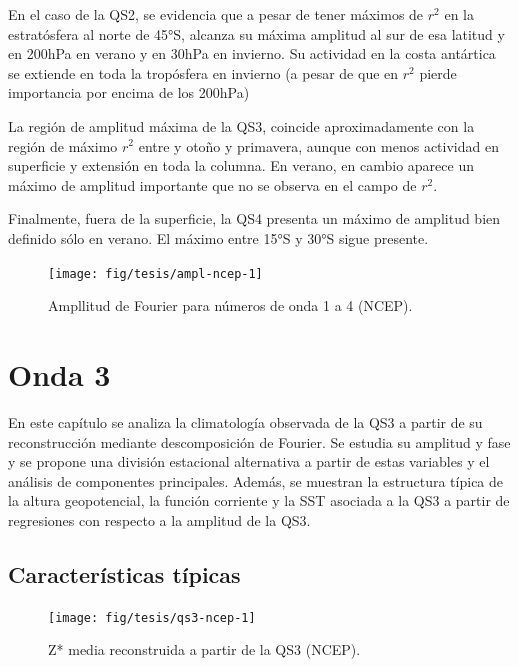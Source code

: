\documentclass[spanish,a4paper,12pt,oneside]{book}
\begin{document}
En el caso de la QS2, se evidencia que a pesar de tener máximos de
\(r^2\) en la estratósfera al norte de 45°S, alcanza su máxima amplitud
al sur de esa latitud y en 200hPa en verano y en 30hPa en invierno. Su
actividad en la costa antártica se extiende en toda la tropósfera en
invierno (a pesar de que en \(r^2\) pierde importancia por encima de los
200hPa)

La región de amplitud máxima de la QS3, coincide aproximadamente con la
región de máximo \(r^2\) entre y otoño y primavera, aunque con menos
actividad en superficie y extensión en toda la columna. En verano, en
cambio aparece un máximo de amplitud importante que no se observa en el
campo de \(r^2\).

Finalmente, fuera de la superficie, la QS4 presenta un máximo de
amplitud bien definido sólo en verano. El máximo entre 15°S y 30°S sigue
presente.

\begin{landscape}\begin{figure}

{\centering \texttt{[image: fig/tesis/ampl-ncep-1]} 

}

\caption{Ampllitud de Fourier para números de onda 1 a 4 (NCEP).}\label{fig:ampl-ncep}
\end{figure}
\end{landscape}

\chapter{Onda 3}\label{onda-3}

En este capítulo se analiza la climatología observada de la QS3 a partir
de su reconstrucción mediante descomposición de Fourier. Se estudia su
amplitud y fase y se propone una división estacional alternativa a
partir de estas variables y el análisis de componentes principales.
Además, se muestran la estructura típica de la altura geopotencial, la
función corriente y la SST asociada a la QS3 a partir de regresiones con
respecto a la amplitud de la QS3.

\section{Características típicas}\label{caracteristicas-tipicas}

\begin{figure}
\texttt{[image: fig/tesis/qs3-ncep-1]} \caption{Z* media reconstruida a partir de la QS3 (NCEP).}\label{fig:qs3-ncep}
\end{figure}
\end{document}
